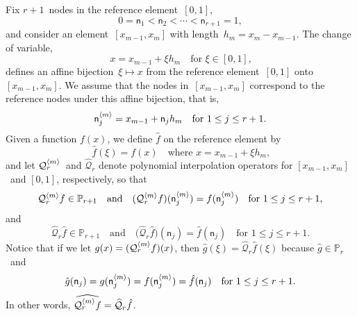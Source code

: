 Fix $r+1$~nodes in the reference element~$[0,1]$,
\[
0=\mathsf{n}_1<\mathsf{n}_2<\cdots<\mathsf{n}_{r+1}=1,
\]
and consider an element~$[x_{m-1},x_m]$ with length~$h_m=x_m-x_{m-1}$.  The 
change of variable,
\[
x = x_{m-1} + \xi h_m\quad\text{for $\xi\in[0,1]$,}
\]
defines an affine bijection~$\xi\mapsto x$ from the reference element~$[0,1]$ 
onto~$[x_{m-1},x_m]$.  We assume that the nodes in~$[x_{m-1},x_m]$ correspond 
to the reference nodes under this affine bijection, that is,
\[
\mathsf{n}_j^{\langle m\rangle}=x_{m-1}+\mathsf{n}_jh_m\quad\text{for $1\le j\le r+1$.}
\]
Given a function $f(x)$, we define $\hat f$ on the reference element by
\[
\hat f(\xi)=f(x)\quad\text{where $x=x_{m-1}+\xi h_m$,}
\]
and let $\mathcal{Q}_r^{\langle m\rangle}$~and $\widehat{\mathcal{Q}}_r$ denote 
polynomial interpolation operators for $[x_{m-1},x_m]$~and $[0,1]$, 
respectively, so that
\[
\mathcal{Q}_r^{\langle m\rangle}f\in\mathbb{P}_{r+1}\quad\text{and}\quad
(\mathcal{Q}_r^{\langle m\rangle}f)(\mathsf{n}_j^{\langle m\rangle})=f(\mathsf{n}_j^{\langle m\rangle})
\quad\text{for $1\le j\le r+1$,}
\]
and
\[
\widehat{\mathcal{Q}}_r\hat f\in\mathbb{P}_{r+1}\quad\text{and}\quad
\bigl(\widehat{\mathcal{Q}}_r\hat f\bigr)(\mathsf{n}_j)=\hat f(\mathsf{n}_j)
\quad\text{for $1\le j\le r+1$.}
\]
Notice that if we let $g(x)=(\mathcal{Q}_r^{\langle m\rangle}f)(x)$, then 
$\hat g(\xi)=\widehat{\mathcal{Q}}_r\hat f(\xi)$ because $\hat 
g\in\mathbb{P}_r$~and 
\[
\hat g(\mathsf{n}_j)=g(\mathsf{n}_j^{\langle m\rangle})=f(\mathsf{n}_j^{\langle m\rangle})
    =\hat f(\mathsf{n}_j)\quad\text{for $1\le j\le r+1$.}
\]
In other words, 
$\widehat{\mathcal{Q}_r^{\langle m\rangle}f}=\widehat{\mathcal{Q}}_r\hat f$.

